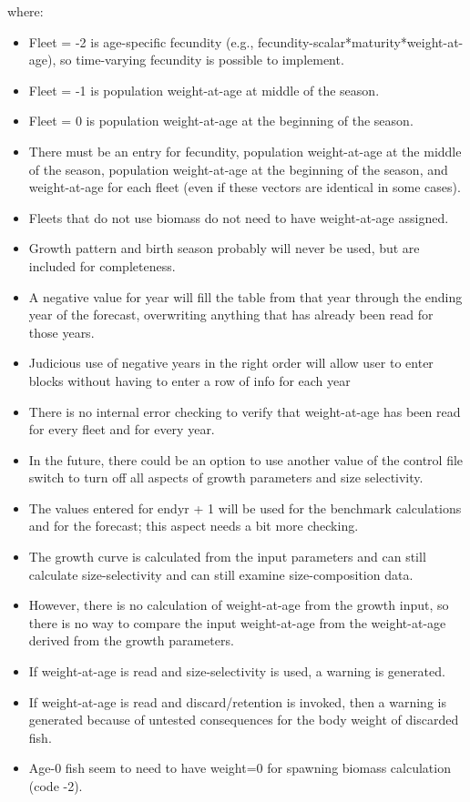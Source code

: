 where:

\begin{itemize}
	\item Fleet = -2 is age-specific fecundity (e.g., fecundity-scalar*maturity*weight-at-age), so time-varying fecundity is possible to implement.
	\item Fleet = -1 is population weight-at-age at middle of the season.
	\item Fleet = 0 is population weight-at-age at the beginning of the season.
	\item There must be an entry for fecundity, population weight-at-age at the middle of the season, population weight-at-age at the beginning of the season, and weight-at-age for each fleet (even if these vectors are identical in some cases).
	\item Fleets that do not use biomass do not need to have weight-at-age assigned.
	\item Growth pattern and birth season probably will never be used, but are included for completeness.
	\item A negative value for year will fill the table from that year through the ending year of the forecast, overwriting anything that has already been read for those years.
	\item Judicious use of negative years in the right order will allow user to enter blocks without having to enter a row of info for each year
	\item There is no internal error checking to  verify that weight-at-age has been read for every fleet and for every year.
	\item In the future, there could be an option to use another value of the control file switch to turn off all aspects of growth parameters and size selectivity.
	\item The values entered for endyr + 1 will be used for the benchmark calculations and for the forecast; this aspect needs a bit more checking.
\end{itemize}


		 \begin{itemize}
			\item The growth curve is calculated from the input parameters and can still calculate size-selectivity and can still examine size-composition data.
			\item However, there is no calculation of weight-at-age from the growth input, so there is no way to compare the input weight-at-age from the weight-at-age derived from the growth parameters.
			\item If weight-at-age is read and size-selectivity is used, a warning is generated.
			\item If weight-at-age is read and discard/retention is invoked, then a warning is generated because of untested consequences for the body weight of discarded fish.
			\item Age-0 fish seem to need to have weight=0 for spawning biomass calculation (code -2).
		\end{itemize}

